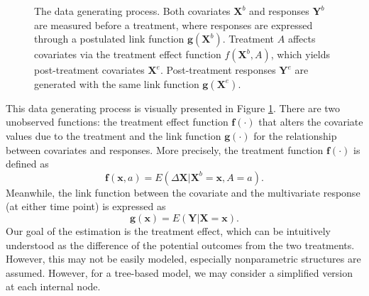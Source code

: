 \documentclass[smallextended]{svjour3}
\begin{document}
\begin{figure}[!h]
    \centering
    \caption{The data generating process. Both covariates $\bm X^b$ and responses $\bm Y^b$ are measured before a treatment, where responses are expressed through a postulated link function $\bm g(\bm X^b)$. Treatment $A$ affects covariates via the treatment effect function $f(\bm X^b, A)$, which yields post-treatment covariates $\bm X^e$. Post-treatment responses $\bm Y^e$ are generated with the same link function $\bm g(\bm X^e)$.}\label{fig1}
\end{figure}

This data generating process is visually presented in Figure \ref{fig1}. There are two unobserved functions: the treatment effect function $\bm f(\cdot)$ that alters the covariate values due to the treatment and the link function $\bm g(\cdot)$ for the relationship between covariates and responses. More precisely, the treatment function $\bm f(\cdot)$ is defined as 
$$\bm f(\bm x,a) = E(\Delta \bm X | \bm X^b=\bm x,A=a).$$
Meanwhile, the link function between the covariate and the multivariate response (at either time point) is expressed as 
$$\bm g(\bm x) = E(\bm Y |  \bm X = \bm x).$$
Our goal of the estimation is the treatment effect, which can be intuitively understood as the difference of the potential outcomes \citep{rubin1974estimating} from the two treatments. However, this may not be easily modeled, especially nonparametric structures are assumed. However, for a tree-based model, we may consider a simplified version at each internal node. 
\end{document}
